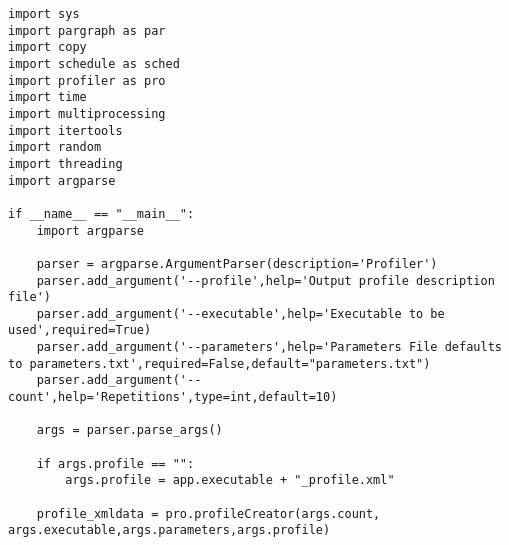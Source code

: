 \documentclass[a4paper,10pt,twoside]{book}
\begin{document}
\begin{lstlisting}[language=CCC, caption=appprofile.py]
import sys
import pargraph as par
import copy
import schedule as sched
import profiler as pro
import time
import multiprocessing
import itertools
import random
import threading
import argparse

if __name__ == "__main__":
	import argparse

	parser = argparse.ArgumentParser(description='Profiler')
	parser.add_argument('--profile',help='Output profile description file')
	parser.add_argument('--executable',help='Executable to be used',required=True)
	parser.add_argument('--parameters',help='Parameters File defaults to parameters.txt',required=False,default="parameters.txt")
	parser.add_argument('--count',help='Repetitions',type=int,default=10)

	args = parser.parse_args()

	if args.profile == "":
		args.profile = app.executable + "_profile.xml"
	
	profile_xmldata = pro.profileCreator(args.count, args.executable,args.parameters,args.profile)

\end{lstlisting}
\end{document}
